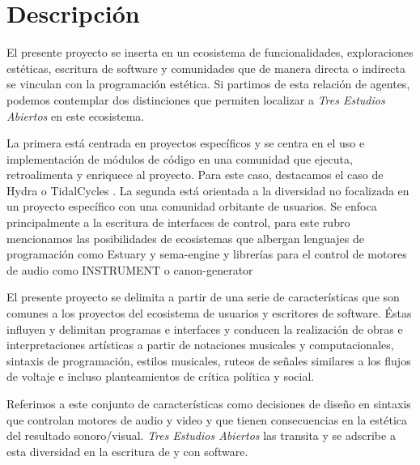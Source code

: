 \section*{Descripción} %

El presente proyecto se inserta en un ecosistema de funcionalidades, exploraciones estéticas, escritura de software y comunidades que de manera directa o indirecta se vinculan con la programación estética. Si partimos de esta relación de agentes, podemos contemplar dos distinciones que permiten localizar a \textit{Tres Estudios Abiertos} en este ecosistema. 



La primera está centrada en proyectos específicos y se centra en el uso e implementación de módulos de código en una comunidad que ejecuta, retroalimenta y enriquece al proyecto. Para este caso, destacamos el caso de Hydra \citep{hydra} o TidalCycles \citep{tidal}. La segunda está orientada a la diversidad no focalizada en un proyecto específico con una comunidad orbitante de usuarios. Se enfoca principalmente a la escritura de interfaces de control, para este rubro mencionamos las posibilidades de ecosistemas que albergan lenguajes de programación como Estuary \citep{estuary} y sema-engine \citep{sema} y librerías para el control de motores de audio como INSTRUMENT \citep{instrument} o canon-generator \citep{canongenerator}

El presente proyecto se delimita a partir de una serie de características que son comunes a los proyectos del ecosistema de usuarios y escritores de software. Éstas influyen y delimitan programas e interfaces y conducen la realización de obras e interpretaciones artísticas a partir de notaciones musicales y computacionales, sintaxis de programación, estilos musicales, ruteos de señales similares a los flujos de voltaje e incluso planteamientos de crítica política y social. 

Referimos a este conjunto de características como decisiones de diseño en sintaxis que controlan motores de audio y video y que tienen consecuencias en la estética del resultado sonoro/visual. \textit{Tres Estudios Abiertos} las transita y se adscribe a esta diversidad en la escritura de y con software.

